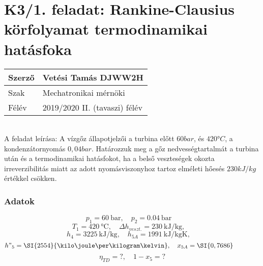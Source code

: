 \section*{K3/1. feladat: Rankine-Clausius körfolyamat termodinamikai hatásfoka}
        \begin{tabular}{ | p{2cm} | p{14cm} | } 
            \hline
            Szerző & Vetési Tamás DJWW2H \\
            \hline
            Szak & Mechatronikai mérnöki \\
            \hline
            Félév & 2019/2020 II. (tavaszi) félév \\
            \hline
        \end{tabular}
            \vspace{0.5cm}
            \\
A feladat leírása:
A vízgőz állapotjelzői a turbina előtt $60 bar$, és $420 °C$, a kondenzátornyomás $0,04 bar$. Határozzuk meg a gőz nedvességtartalmát a turbina után és a termodinamikai hatásfokot, ha a belső veszteségek okozta irreverzibilitás miatt az adott nyomásviszonyhoz tartoz elméleti hőesés $230 kJ/kg$ értékkel csökken.

\subsubsection{Adatok} 
			\begin{equation*}
				p_1= \SI{60}{\bar},
				\quad
				p_2= \SI{0,04}{\bar}
				\quad
				\end{equation*}
				\begin{equation*}
				T_1=\SI{420}{\celsius},
				\quad
				\Delta h_{veszt.} = \SI{230}{\kilo\joule\per\kilogram},
				\quad
				\end{equation*}
				\begin{equation*}
				h_4= \SI{3225}{\kilo\joule\per\kilogram},
				\quad
				h_{5A} = \SI{1991}{\kilo\joule\per\kilogram\kelvin},
				\quad
				\end{equation*}
				\begin{equation*}
				h"_5 = \SI{2554}{\kilo\joule\per\kilogram\kelvin},
				\quad
				x_{5A} = \SI{0,7686}
				\quad
				\quad
				\quad
				\quad
				\end{equation*}
				\begin{equation*}
				\eta_{TD} = \text{?},
				\quad
				1-x_5 = \text{?}
			\end{equation*}
			\noindent\hrulefill

